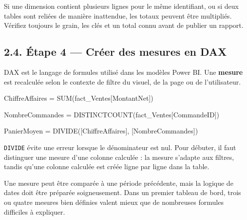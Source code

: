 \documentclass[
  french,
  letterpaper,
  open=any]{scrbook}
\newenvironment{Shaded}{\begin{snugshade}}{\end{snugshade}}
\newcommand{\NormalTok}[1]{\textcolor[rgb]{0.00,0.23,0.31}{#1}}
\theoremstyle{definition}
\theoremstyle{definition}
\theoremstyle{remark}
\begin{document}
\begin{tcolorbox}[enhanced jigsaw, arc=.35mm, bottomrule=.15mm, bottomtitle=1mm, breakable, colback=white, colbacktitle=quarto-callout-warning-color!10!white, colframe=quarto-callout-warning-color-frame, coltitle=black, left=2mm, leftrule=.75mm, opacityback=0, opacitybacktitle=0.6, rightrule=.15mm, title=\textcolor{quarto-callout-warning-color}{\faExclamationTriangle}\hspace{0.5em}{Le piège des relations ambiguës}, titlerule=0mm, toprule=.15mm, toptitle=1mm]

Si une dimension contient plusieurs lignes pour le même identifiant, ou
si deux tables sont reliées de manière inattendue, les totaux peuvent
être multipliés. Vérifiez toujours le grain, les clés et un total connu
avant de publier un rapport.

\end{tcolorbox}

\subsection{2.4. Étape 4 --- Créer des mesures en
DAX}\label{uxe9tape-4-cruxe9er-des-mesures-en-dax}

DAX est le langage de formules utilisé dans les modèles Power BI. Une
\textbf{mesure} est recalculée selon le contexte de filtre du visuel, de
la page ou de l'utilisateur.

\begin{Shaded}
\begin{Highlighting}[]
\NormalTok{ChiffreAffaires = SUM(fact\_Ventes[MontantNet])}

\NormalTok{NombreCommandes = DISTINCTCOUNT(fact\_Ventes[CommandeID])}

\NormalTok{PanierMoyen = DIVIDE([ChiffreAffaires], [NombreCommandes])}
\end{Highlighting}
\end{Shaded}

\texttt{DIVIDE} évite une erreur lorsque le dénominateur est nul. Pour
débuter, il faut distinguer une mesure d'une colonne calculée : la
mesure s'adapte aux filtres, tandis qu'une colonne calculée est créée
ligne par ligne dans la table.

Une mesure peut être comparée à une période précédente, mais la logique
de dates doit être préparée soigneusement. Dans un premier tableau de
bord, trois ou quatre mesures bien définies valent mieux que de
nombreuses formules difficiles à expliquer.
\end{document}
